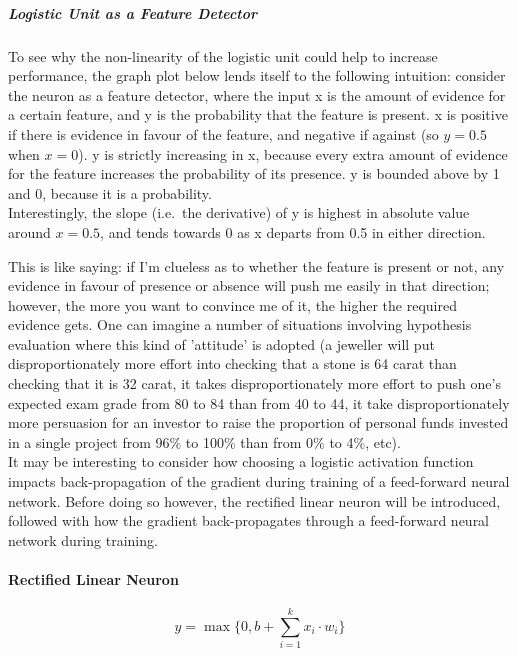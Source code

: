 \documentclass[a4paper,11pt]{article}
\begin{document}
\subparagraph{Logistic Unit as a Feature Detector}

To see why the non-linearity of the logistic unit could help to increase performance, the graph plot below lends itself to the following intuition: consider the neuron as a feature detector, where the input x is the amount of evidence for a certain feature, and y is the probability that the feature is present. x is positive if there is evidence in favour of the feature, and negative if against (so $y=0.5$ when $x=0$). y is strictly increasing in x, because every extra amount of evidence for the feature increases the probability of its presence. y is bounded above by 1 and 0, because it is a probability. \\

Interestingly, the slope (i.e.\ the derivative) of y is highest in absolute value around $x=0.5$, and tends towards 0 as x departs from 0.5 in either direction. 

\begin{figure}[h!]
	\centering
\end{figure}

This is like saying: if I'm clueless as to whether the feature is present or not, any evidence in favour of presence or absence will push me easily in that direction; however, the more you want to convince me of it, the higher the required evidence gets. One can imagine a number of situations involving hypothesis evaluation where this kind of 'attitude' is adopted (a jeweller will put disproportionately more effort into checking that a stone is 64 carat than checking that it is 32 carat, it takes disproportionately more effort to push one's expected exam grade from 80 to 84 than from 40 to 44, it take disproportionately more persuasion for an investor to raise the proportion of personal funds invested in a single project from 96\% to 100\% than from 0\% to 4\%, etc). \\

It may be interesting to consider how choosing a logistic activation function impacts back-propagation of the gradient during training of a feed-forward neural network. Before doing so however, the rectified linear neuron will be introduced, followed with how the gradient back-propagates through a feed-forward neural network during training. \\
                
\paragraph{Rectified Linear Neuron}
\begin{equation}
\label{relu}
y = \max\{0, b + \sum\limits_{i=1}^k x_{i}\cdot w_{i}\}
\end{equation}
\end{document}
